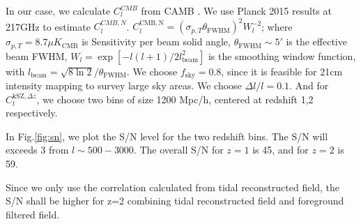 In our case, we calculate $C_l^{CMB}$ from CAMB \cite{CAMB}. 
We use Planck 2015 results \cite{Planck2015} at 217GHz to estimate $C_l^{CMB,N}$.
$C_l^\mathrm{CMB,N}=(\sigma_{p,T}\theta_\mathrm{FWHM})^2W_l^{-2}$;  
where $\sigma_{p,T}=8.7\mu K_\mathrm{CMB}$ is Sensitivity per beam solid angle, 
$\theta_\mathrm{FWHM}\sim 5'$ is the effective beam FWHM, 
$W_l=\exp[-l(l+1)/2l^2_\mathrm{beam}]$ is the smoothing window function, 
with $l_\mathrm{beam}=\sqrt{8\ln2}/\theta_\mathrm{FWHM}$. 
We choose $f_\mathrm{sky}=0.8$, since it is feasible for 21cm intensity mapping to survey large sky areas. 
We choose $\Delta l/l=0.1$. 
And for $C_l^{\mathrm{kSZ},\Delta z}$, we choose two bins of size 1200 Mpc/h, centered at redshift 1,2 respectively.

In Fig.\ref{fig:sn}, we plot the S/N level for the two redshift bins. 
The S/N will exceeds 3 from $l\sim 500-3000$. 
The overall S/N for $z=1$ is 45, and for $z=2$ is 59. 

Since we only use the correlation calculated from tidal reconstructed field, the S/N shall be higher for z=2  
combining tidal reconstructed field and foreground filtered field. 

